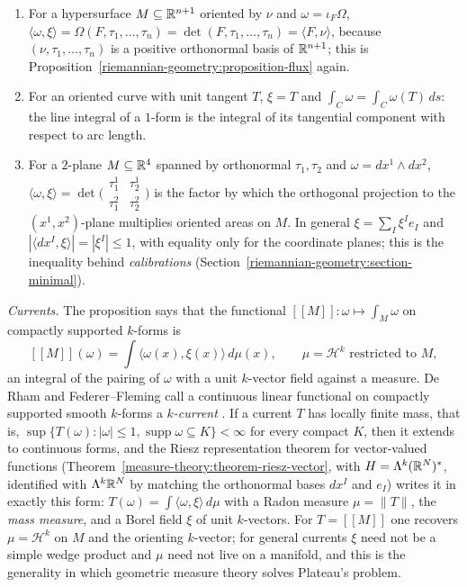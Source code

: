 \begin{example}\label{riemannian-geometry:example-orienting-vector}
\begin{enumerate}
\item For a hypersurface $M \subseteq \mathbb{R}^{n+1}$ oriented by $\nu$ and $\omega = \iota_F\Omega$, $\langle\omega, \xi\rangle = \Omega(F, \tau_1, \ldots, \tau_n) = \det(F, \tau_1, \ldots, \tau_n) = \langle F, \nu\rangle$, because
$(\nu, \tau_1, \ldots, \tau_n)$ is a positive orthonormal basis of $\mathbb{R}^{n+1}$; this is Proposition~\ref{riemannian-geometry:proposition-flux} again.
\item For an oriented curve with unit tangent $T$, $\xi = T$ and $\int_C\omega = \int_C\omega(T)\,ds$: the line integral of a $1$-form is the integral of its tangential component with respect to arc length.
\item For a $2$-plane $M \subseteq \mathbb{R}^4$ spanned by orthonormal $\tau_1, \tau_2$ and $\omega = dx^1 \wedge dx^2$, $\langle\omega, \xi\rangle = \det\bigl(\begin{smallmatrix} \tau_1^1 & \tau_2^1\\ \tau_1^2 & \tau_2^2\end{smallmatrix}\bigr)$ is the factor by
which the orthogonal projection to the $(x^1, x^2)$-plane multiplies oriented areas on $M$. In general $\xi = \sum_I\xi^Ie_I$ and $|\langle dx^I, \xi\rangle| = |\xi^I| \leq 1$, with equality only for the
coordinate planes; this is the inequality behind \emph{calibrations} (Section~\ref{riemannian-geometry:section-minimal}).
\end{enumerate}
\end{example}

\begin{remark}\label{riemannian-geometry:remark-currents}
\emph{Currents.} The proposition says that the functional $[\![M]\!] \colon \omega \mapsto \int_M\omega$ on compactly supported $k$-forms is
\[
[\![M]\!](\omega) = \int\langle\omega(x), \xi(x)\rangle\,d\mu(x), \qquad \mu = \mathcal{H}^k \text{ restricted to } M,
\]
an integral of the pairing of $\omega$ with a unit $k$-vector field against a measure. De Rham and Federer--Fleming call a continuous linear functional on compactly supported smooth $k$-forms a
\emph{$k$-current} \cite{federer-fleming-1960}. If a current $T$ has locally finite mass, that is, $\sup\{T(\omega) : |\omega| \leq 1, \operatorname{supp}\omega \subseteq K\} < \infty$ for every compact $K$, then it
extends to continuous forms, and the Riesz representation theorem for vector-valued functions (Theorem~\ref{measure-theory:theorem-riesz-vector}, with $H = \Lambda^k(\mathbb{R}^N)^*$, identified with $\Lambda^k\mathbb{R}^N$ by matching the orthonormal bases $dx^I$ and $e_I$)
writes it in exactly this form: $T(\omega) = \int\langle\omega, \xi\rangle\,d\mu$ with a Radon measure $\mu = \|T\|$, the \emph{mass measure}, and a Borel field $\xi$ of unit $k$-vectors. For $T = [\![M]\!]$ one recovers
$\mu = \mathcal{H}^k$ on $M$ and the orienting $k$-vector; for general currents $\xi$ need not be a simple wedge product and $\mu$ need not live on a manifold, and this is the generality in which geometric measure
theory solves Plateau's problem.
\end{remark}


